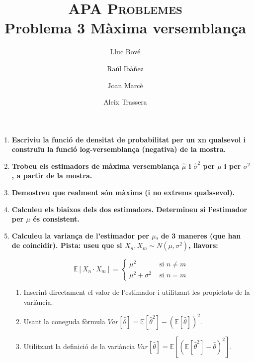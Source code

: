 \documentclass[a4paper]{article}
\title{\textsc{APA Problemes} \\ Problema 3 Màxima versemblança}
\author{Lluc Bové \and Raúl Ibàñez \and Joan Marcè \and Aleix Trassera}
\date{}
\begin{document}
\maketitle

\begin{enumerate}
\item \textbf{Escriviu la funció de densitat de probabilitat per un xn qualsevol i construïu la funció log-versemblança (negativa) de la mostra.}

\item \textbf{Trobeu els estimadors de màxima versemblança $\hat{\mu}$ i $\hat{\sigma}^2$ per $\mu$ i per $\sigma^2$, a partir de la mostra.}

\item \textbf{Demostreu que realment són màxims (i no extrems qualssevol).}

\item \textbf{Calculeu els biaixos dels dos estimadors. Determineu si l'estimador per $\mu$ és consistent.}

\item \textbf{Calculeu la variança de l'estimador per $\mu$, de 3 maneres (que han de coincidir). Pista: useu que si $X_n, X_m \sim N(\mu, \sigma^2)$, llavors:}

$$ \mathbb{E}[X_n · X_m] = 
\begin{cases}
\mu^2 & \text{ si } n \ne m \\
\mu^2 + \sigma^2 & \text{ si } n = m
\end{cases}$$

\begin{enumerate}
    \item Inserint directament el valor de l'estimador i utilitzant les propietats de la variància. 
    \item Usant la coneguda fòrmula $Var[\hat{\theta}] = \mathbb{E}[\hat{\theta}^2] - (\mathbb{E}[\hat{\theta}])^2$.
    \item Utilitzant la definició de la variància $Var[\hat{\theta}] = \mathbb{E}[(\mathbb{E}[\hat{\theta}^2] - \hat{\theta})^2]$.
\end{enumerate}

\end{enumerate}
\end{document}
